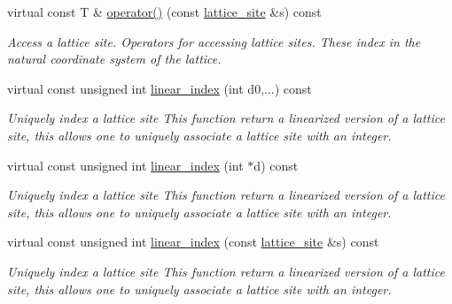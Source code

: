 \begin{DoxyCompactItemize}
\mbox{\label{classsisl_1_1body__centered__cubic_a279eb3385f2f252a30ad968951494922}} 
virtual const T \& \hyperlink{classsisl_1_1body__centered__cubic_a279eb3385f2f252a30ad968951494922}{operator()} (const \hyperlink{namespacesisl_acd18feee4026583db6185df2b25434aa}{lattice\+\_\+site} \&s) const
\begin{DoxyCompactList}\small\item\em Access a lattice site. Operators for accessing lattice sites. These index in the natural coordinate system of the lattice. \end{DoxyCompactList}\item 
\mbox{\label{classsisl_1_1body__centered__cubic_a6dfe90a15bb88786ac5c8b15cfe50285}} 
virtual const unsigned int \hyperlink{classsisl_1_1body__centered__cubic_a6dfe90a15bb88786ac5c8b15cfe50285}{linear\+\_\+index} (int d0,...) const
\begin{DoxyCompactList}\small\item\em Uniquely index a lattice site This function return a linearized version of a lattice site, this allows one to uniquely associate a lattice site with an integer. \end{DoxyCompactList}\item 
\mbox{\label{classsisl_1_1body__centered__cubic_a6f12217c00c0a417a80ef7c20b9281a8}} 
virtual const unsigned int \hyperlink{classsisl_1_1body__centered__cubic_a6f12217c00c0a417a80ef7c20b9281a8}{linear\+\_\+index} (int $\ast$d) const
\begin{DoxyCompactList}\small\item\em Uniquely index a lattice site This function return a linearized version of a lattice site, this allows one to uniquely associate a lattice site with an integer. \end{DoxyCompactList}\item 
\mbox{\label{classsisl_1_1body__centered__cubic_aa34843f446ce5f8e3b0e64e78597d592}} 
virtual const unsigned int \hyperlink{classsisl_1_1body__centered__cubic_aa34843f446ce5f8e3b0e64e78597d592}{linear\+\_\+index} (const \hyperlink{namespacesisl_acd18feee4026583db6185df2b25434aa}{lattice\+\_\+site} \&s) const
\begin{DoxyCompactList}\small\item\em Uniquely index a lattice site This function return a linearized version of a lattice site, this allows one to uniquely associate a lattice site with an integer. \end{DoxyCompactList}\item 

\end{DoxyCompactItemize}
